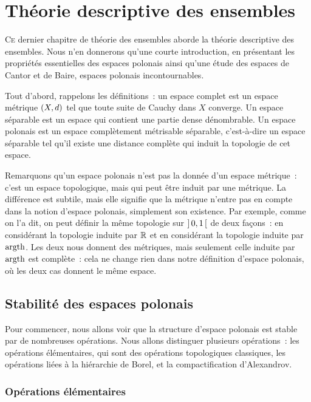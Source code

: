 \chapter{Théorie descriptive des ensembles}
\label{chp.desc}

\minitoc

\lettrine{C}{e} dernier chapitre de théorie des ensembles aborde la théorie
descriptive des ensembles. Nous n'en donnerons qu'une courte introduction, en
présentant les propriétés essentielles des espaces polonais ainsi qu'une étude
des espaces de Cantor et de Baire, espaces polonais incontournables.

Tout d'abord, rappelons les définitions~: un espace complet est un espace
métrique $(X,d)$ tel que toute suite de Cauchy dans $X$ converge. Un
espace séparable est un espace qui contient une partie dense dénombrable. Un
espace polonais est un espace complètement métrisable séparable, c'est-à-dire un
espace séparable tel qu'il existe une distance complète qui induit la topologie
de cet espace.

Remarquons qu'un espace polonais n'est pas la donnée d'un espace métrique~:
c'est un espace topologique, mais qui peut être induit par une métrique. La
différence est subtile, mais elle signifie que la métrique n'entre pas en compte
dans la notion d'espace polonais, simplement son existence. Par exemple, comme
on l'a dit, on peut définir la même topologie sur $\mathord{\left]\,0,1\,\right[}$ de deux
façons~: en considérant la topologie induite par $\mathbb R$ et en considérant la
topologie induite par $\operatorname{argth}$. Les deux nous donnent des métriques, mais
seulement celle induite par $\operatorname{argth}$ est complète~: cela ne change rien dans
notre définition d'espace polonais, où les deux cas donnent le même espace.

\section{Stabilité des espaces polonais}

Pour commencer, nous allons voir que la structure d'espace polonais est stable
par de nombreuses opérations. Nous allons distinguer plusieurs opérations~: les
opérations élémentaires, qui sont des opérations topologiques classiques, les
opérations liées à la hiérarchie de Borel, et la compactification d'Alexandrov.

\subsection{Opérations élémentaires}

